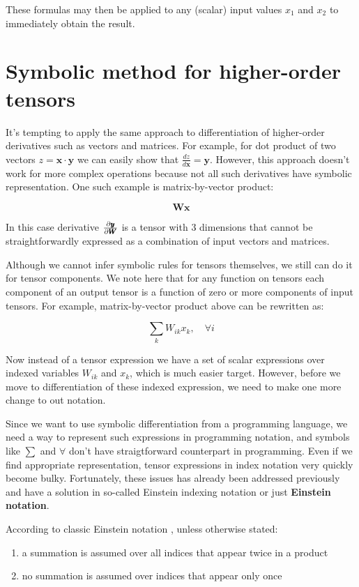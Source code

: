 \documentclass[conference]{IEEEtran}
\begin{document}
These formulas may then be applied to any (scalar) input values $x_1$
and $x_2$ to immediately obtain the result.

\section{Symbolic method for higher-order tensors}

It's tempting to apply the same approach to differentiation of
higher-order derivatives such as vectors and matrices. For example,
for dot product of two vectors $z = \pmb{x} \cdot \pmb{y}$ we can
easily show that $\frac{dz}{d\pmb{x}} = \pmb{y}$. However, this
approach doesn't work for more complex operations because not all such
derivatives have symbolic representation. One such example is
matrix-by-vector product:

$$\pmb{W}\pmb{x}$$

In this case derivative $\pdv{\pmb{y}}{\pmb{W}}$ is a tensor with 3
dimensions that cannot be straightforwardly expressed as a combination
of input vectors and matrices.

Although we cannot infer symbolic rules for tensors themselves, we
still can do it for tensor components. We note here that for any
function on tensors each component of an output tensor is a function
of zero or more components of input tensors. For example,
matrix-by-vector product above can be rewritten as:

$$\sum_kW_{ik}x_k ,\quad \forall i$$

Now instead of a tensor expression we have a set of scalar expressions
over indexed variables $W_{ik}$ and $x_k$, which is much easier
target.  However, before we move to differentiation of these indexed
expression, we need to make one more change to out notation.

Since we want to use symbolic differentiation from a programming
language, we need a way to represent such expressions in programming
notation, and symbols like $\sum$ and $\forall$ don't have
straigtforward counterpart in programming. Even if we find appropriate
representation, tensor expressions in index notation very quickly
become bulky. Fortunately, these issues has already been addressed
previously and have a solution in so-called Einstein indexing notation
or just \textbf{Einstein notation}.

According to classic Einstein notation \cite{Dullemond1991}, unless
otherwise stated:


\begin{enumerate}
\item a summation is assumed over all indices that appear twice in a
  product
\item no summation is assumed over indices that appear only once
\end{enumerate}
\end{document}

